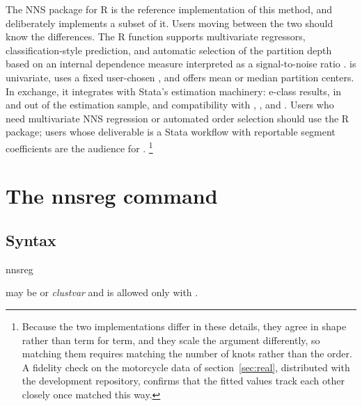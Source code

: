 \documentclass[bib]{statapress}
\begin{document}
The NNS package for R \citep{viole_2026_nns} is the reference implementation
of this method, and  deliberately implements a subset of it.
Users moving between the two should know the differences.  The R function
 supports multivariate regressors, classification-style
prediction, and automatic selection of the partition depth based on an
internal dependence measure interpreted as a signal-to-noise ratio
\citep{vinod_viole_2018_segments}.   is univariate, uses a
fixed user-chosen , and offers mean or median partition
centers.  In exchange, it integrates with Stata's estimation machinery:
e-class results,  in and out of the estimation sample, and
compatibility with , , and .
Users who need multivariate NNS regression or automated order selection
should use the R package; users whose deliverable is a Stata workflow with
reportable segment coefficients are the audience for .%
\footnote{Because the two implementations differ in these details, they agree
in shape rather than term for term, and they scale the 
argument differently, so matching them requires matching the number of knots
rather than the order.  A fidelity check on the motorcycle data of
section~\ref{sec:real}, distributed with the development repository, confirms
that the fitted values track each other closely once matched this way.}

\section{The nnsreg command}
\label{sec:command}

\subsection{Syntax}

\begin{stsyntax}
nnsreg
\depvar\
\varname\
\optif\
\optin\
\end{stsyntax}

\noindent
{} may be  or 
{\it clustvar\/} and is allowed only with .
\end{document}
